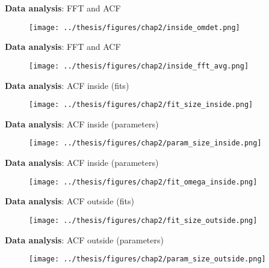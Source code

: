 \documentclass[aspectratio=169]{beamer}
\begin{document}
\begin{frame}{\textbf{Data analysis}: FFT and ACF}
  \begin{figure}
      \centering
      \texttt{[image: ../thesis/figures/chap2/inside\_omdet.png]}
  \end{figure}
\end{frame}

\begin{frame}{\textbf{Data analysis}: FFT and ACF}
  \begin{figure}
      \centering
      \texttt{[image: ../thesis/figures/chap2/inside\_fft\_avg.png]}
  \end{figure}
\end{frame}

\begin{frame}{\textbf{Data analysis}: ACF inside (fits)}
  \begin{figure}
      \centering
      \texttt{[image: ../thesis/figures/chap2/fit\_size\_inside.png]}
  \end{figure}
\end{frame}

\begin{frame}{\textbf{Data analysis}: ACF inside (parameters)}
  \begin{figure}
      \centering
      \texttt{[image: ../thesis/figures/chap2/param\_size\_inside.png]}
  \end{figure}
\end{frame}

\begin{frame}{\textbf{Data analysis}: ACF inside (parameters)}
  \begin{figure}
      \centering
      \texttt{[image: ../thesis/figures/chap2/fit\_omega\_inside.png]}
  \end{figure}
\end{frame}

\begin{frame}{\textbf{Data analysis}: ACF outside (fits)}
  \begin{figure}
      \centering
      \texttt{[image: ../thesis/figures/chap2/fit\_size\_outside.png]}
  \end{figure}
\end{frame}

\begin{frame}{\textbf{Data analysis}: ACF outside (parameters)}
  \begin{figure}
    \centering
    \texttt{[image: ../thesis/figures/chap2/param\_size\_outside.png]}
  \end{figure}
\end{frame}
\end{document}
